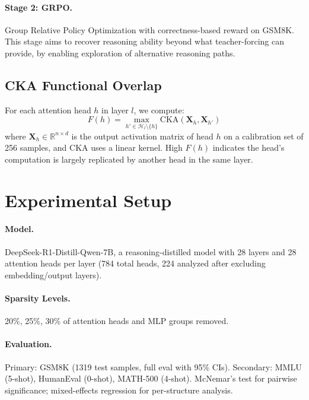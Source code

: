 \documentclass[11pt,a4paper]{article}
\begin{document}
\paragraph{Stage 2: GRPO.}
Group Relative Policy Optimization \cite{grpo2024} with correctness-based reward on GSM8K.
This stage aims to recover reasoning ability beyond what teacher-forcing can provide, by enabling exploration of alternative reasoning paths.

\subsection{CKA Functional Overlap}
\label{sec:cka}

For each attention head $h$ in layer $l$, we compute:
\begin{equation}
F(h) = \max_{h' \in \mathcal{H}_l \setminus \{h\}} \text{CKA}(\mathbf{X}_h, \mathbf{X}_{h'})
\end{equation}
where $\mathbf{X}_h \in \mathbb{R}^{n \times d}$ is the output activation matrix of head $h$ on a calibration set of 256 samples, and CKA uses a linear kernel.
High $F(h)$ indicates the head's computation is largely replicated by another head in the same layer.

\section{Experimental Setup}
\label{sec:setup}

\paragraph{Model.} DeepSeek-R1-Distill-Qwen-7B, a reasoning-distilled model with 28 layers and 28 attention heads per layer (784 total heads, 224 analyzed after excluding embedding/output layers).

\paragraph{Sparsity Levels.} 20\%, 25\%, 30\% of attention heads and MLP groups removed.

\paragraph{Evaluation.}
Primary: GSM8K (1319 test samples, full eval with 95\% CIs).
Secondary: MMLU (5-shot), HumanEval (0-shot), MATH-500 (4-shot).
McNemar's test for pairwise significance; mixed-effects regression for per-structure analysis.
\end{document}

